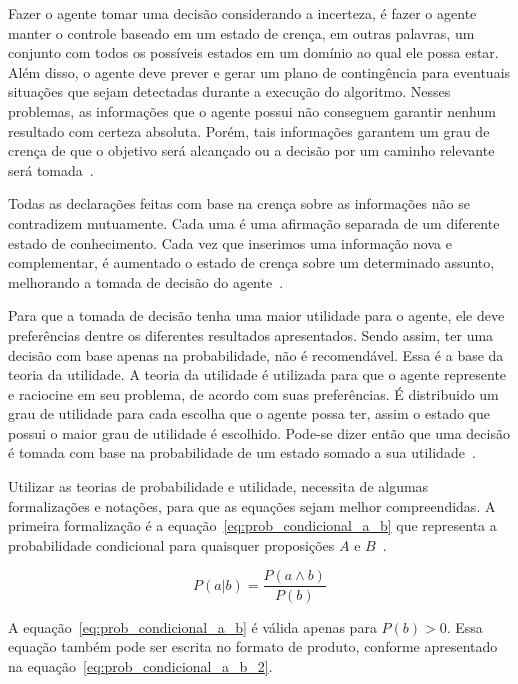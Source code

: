 Fazer o agente tomar uma decisão considerando a incerteza, é fazer o agente manter o controle baseado em um estado de crença, em outras palavras, um conjunto com todos os possíveis estados em um domínio ao qual ele possa estar. Além disso, o agente deve prever e gerar um plano de contingência para eventuais situações que sejam detectadas durante a execução do algoritmo. Nesses problemas, as informações que o agente possui não conseguem garantir nenhum resultado com certeza absoluta. Porém, tais informações garantem um grau de crença de que o objetivo será alcançado ou a decisão por um caminho relevante será tomada~\cite{russell:2002, faceli:2011}.

Todas as declarações feitas com base na crença sobre as informações não se contradizem mutuamente. Cada uma é uma afirmação separada de um diferente estado de conhecimento. Cada vez que inserimos uma informação nova e complementar, é aumentado o estado de crença sobre um determinado assunto, melhorando a tomada de decisão do agente~\cite{faceli:2011}.

Para que a tomada de decisão tenha uma maior utilidade para o agente, ele deve preferências dentre os diferentes resultados apresentados. Sendo assim, ter uma decisão com base apenas na probabilidade, não é recomendável. Essa é a base da teoria da utilidade. A teoria da utilidade é utilizada para que o agente represente e raciocine em seu problema, de acordo com suas preferências. É distribuido um grau de utilidade para cada escolha que o agente possa ter, assim o estado que possui o maior grau de utilidade é escolhido. Pode-se dizer então que uma decisão é tomada com base na probabilidade de um estado somado a sua utilidade~\cite{russell:2002}.

Utilizar as teorias de probabilidade e utilidade, necessita de algumas formalizações e notações, para que as equações sejam melhor compreendidas. A primeira formalização é a equação~\ref{eq:prob_condicional_a_b} que representa a probabilidade condicional para quaisquer proposições $A$ e $B$~\cite{russell:2002}.

\begin{equation}
    \label{eq:prob_condicional_a_b}
    P(a|b) = \frac{P(a \land b)}{P(b)}
\end{equation}

A equação~\ref{eq:prob_condicional_a_b} é válida apenas para $P(b) > 0$. Essa equação também pode ser escrita no formato de produto, conforme apresentado na equação~\ref{eq:prob_condicional_a_b_2}.

